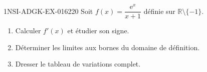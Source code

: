 \begin{exercice}{1NSI-ADGK-EX-016}{2}{20}
Soit $f(x) = \dfrac{\mathrm{e}^x}{x+1}$ définie sur $\mathbb{R} \setminus \{-1\}$.
\begin{enumerate}
  \item Calculer $f'(x)$ et étudier son signe.
  \item Déterminer les limites aux bornes du domaine de définition.
  \item Dresser le tableau de variations complet.
\end{enumerate}

\end{exercice}
